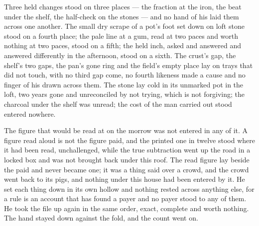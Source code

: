 Three held changes stood on three places --- the fraction at the iron, the beat under the shelf, the half-check on the stones --- and no hand of his laid them across one another. The small dry scrape of a pot's foot set down on loft stone stood on a fourth place; the pale line at a gum, read at two paces and worth nothing at two paces, stood on a fifth; the held inch, asked and answered and answered differently in the afternoon, stood on a sixth. The crust's gap, the shelf's two gaps, the pan's gone ring and the field's empty place lay on trays that did not touch, with no third gap come, no fourth likeness made a cause and no finger of his drawn across them. The stone lay cold in its unmarked pot in the loft, two years gone and unreconciled by not trying, which is not forgiving; the charcoal under the shelf was unread; the cost of the man carried out stood entered nowhere.

The figure that would be read at  on the morrow was not entered in any of it. A figure read aloud is not the figure paid, and the printed one in twelve stood where it had been read, unchallenged, while the true subtraction went up the road in a locked box and was not brought back under this roof. The read figure lay beside the paid and never became one; it was a thing said over a crowd, and the crowd went back to its pigs, and nothing under this house had been entered by it. He set each thing down in its own hollow and nothing rested across anything else, for a rule is an account that has found a payer and no payer stood to any of them. He took the file up again in the same order, exact, complete and worth nothing. The hand stayed down against the fold, and the count went on.
